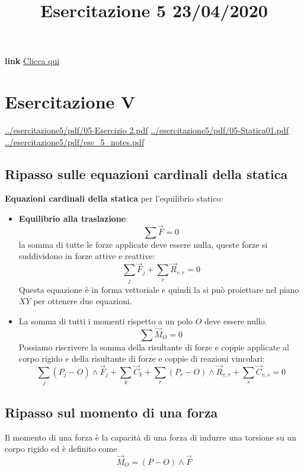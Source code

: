 \title{Esercitazione 5 23/04/2020}\newline
\textbf{link} \href{https://web.microsoftstream.com/video/e80c852f-1851-42f7-9a73-dfb6b8d85ee9}{Clicca qui}
\section{Esercitazione V}
\url{../esercitazione5/pdf/05-Esercizio 2.pdf}\newline
\url{../esercitazione5/pdf/05-Statica01.pdf}\newline
\url{../esercitazione5/pdf/ese_5_notes.pdf}
\subsection{Ripasso sulle equazioni cardinali della statica}
\textbf{Equazioni cardinali della statica} per l'equilibrio statico:
\begin{itemize}
    \item \textbf{Equilibrio alla traslazione}:\[
        \sum \vec{F} = 0 
    \]
    la somma di tutte le forze applicate deve essere nulla, queste forze si suddividono in forze attive e reattive:
    \[
        \sum_j \vec{F}_j + \sum_r \vec{R}_{v,r} = 0
    \]
    Questa equazione è in forma vettoriale e quindi la si può proiettare nel piano $XY$ per ottenere due equazioni.
    \item La somma di tutti i momenti rispetto a un polo $O$ deve essere nullo.
    \[
        \sum \vec{M}_O = 0
    \]
    Possiamo riscrivere la somma della risultante di forze e coppie applicate al corpo rigido e della risultante di forze e coppie di reazioni vincolari:
    \[
        \sum_j (P_j - O) \land \vec{F}_j + \sum_k \vec{C}_k + \sum_r (P_r-O) \land \vec{R}_{v,r} + \sum _s \vec{C}_{v,s} = 0
    \]
\end{itemize}
\subsection{Ripasso sul momento di una forza}
Il momento di una forza è la capacità di una forza di indurre una torsione su un corpo rigido ed è definito come
\[
    \vec{M}_O = (P-O) \land \vec{F}
\]
